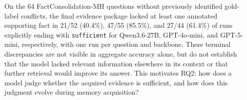 On the 64 FactConsolidation-MH questions without previously identified gold-label conflicts, the final evidence package lacked at least one annotated supporting fact in 21/52 (40.4\%), 47/55 (85.5\%), and 27/44 (61.4\%) of runs explicitly ending with \texttt{sufficient} for Qwen3.6-27B, GPT-4o-mini, and GPT-5-mini, respectively, with one run per question and backbone.
These terminal discrepancies are not visible in aggregate accuracy alone, but do not establish that the model lacked relevant information elsewhere in its context or that further retrieval would improve its answer.
This motivates RQ2: how does a model judge whether the acquired evidence is sufficient, and how does this judgment evolve during memory acquisition?
